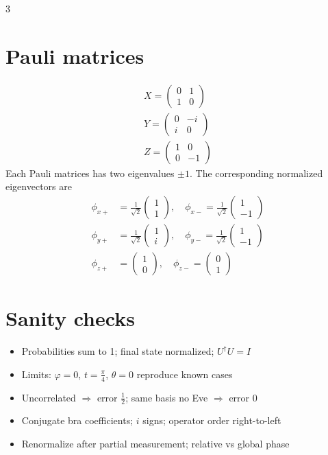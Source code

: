 \documentclass[10pt]{article}
\newcommand{\mathspace}{\quad}
\begin{document}
\begin{multicols*}{3}
\section{Pauli matrices}
\begin{align*} 
	X = \begin{pmatrix} 0 & 1 \\ 1 & 0 \end{pmatrix}  \\
	Y = \begin{pmatrix} 0 & -i \\i  & 0 \end{pmatrix} \\
	Z = \begin{pmatrix} 1 & 0 \\ 0 & -1 \end{pmatrix} 
\end{align*}
Each Pauli matrices has two eigenvalues $\pm 1$. The corresponding normalized eigenvectors are 
\begin{align*} 
	\phi_{x+} &= \frac{1}{\sqrt{2}}\begin{pmatrix} 1 \\ 1 \end{pmatrix}, \mathspace \phi_{x-} = \frac{1}{\sqrt{2}}\begin{pmatrix} 1 \\ -1 \end{pmatrix} \\
	\phi_{y+} &= \frac{1}{\sqrt{2}}\begin{pmatrix} 1 \\ i \end{pmatrix} , \mathspace \phi_{y-} = \frac{1}{\sqrt{2}}\begin{pmatrix} 1 \\ -1 \end{pmatrix} \\
	\phi_{z+} &= \begin{pmatrix} 1 \\ 0 \end{pmatrix}, \mathspace \phi_{z-} = \begin{pmatrix} 0 \\ 1 \end{pmatrix} 
\end{align*}
\section{Sanity checks}
\begin{itemize}
  \item Probabilities sum to 1; final state normalized; $U^\dagger U=I$
  \item Limits: $\varphi=0$, $t=\tfrac\pi4$, $\theta=0$ reproduce known cases
  \item Uncorrelated $\Rightarrow$ error $\tfrac12$; same basis no Eve $\Rightarrow$ error 0
  \item Conjugate bra coefficients; $i$ signs; operator order right-to-left
  \item Renormalize after partial measurement; relative vs global phase
\end{itemize}


\end{multicols*}
\end{document}

